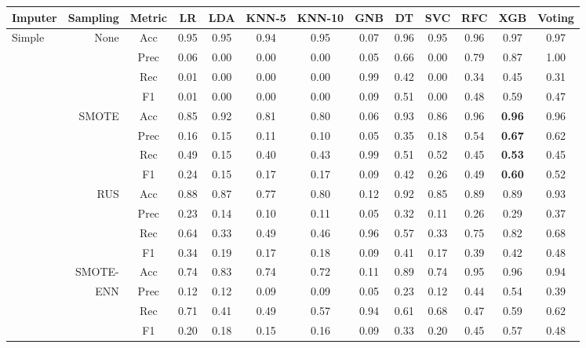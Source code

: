 \begin{table*}
\ContinuedFloat
\begin{narrow}{-1cm}{-1cm}
\begin{subtable}[t]{2.05\columnwidth}
    \centering
    \begin{tabular}{l|r|c|cccccccccc}
       Imputer & Sampling & Metric & LR & LDA & KNN-5 & KNN-10 & GNB & DT & SVC & RFC & XGB & Voting \\
        \hline \hline
        
        Simple & None & Acc & 0.95 & 0.95 & 0.94 & 0.95 & 0.07 & 0.96 & 0.95 & 0.96 & 0.97 & 0.97 \\
        ~ & ~ & Prec & 0.06 & 0.00 & 0.00 & 0.00 & 0.05 & 0.66 & 0.00 & 0.79 & 0.87 & 1.00 \\
        ~ & ~ & Rec & 0.01 & 0.00 & 0.00 & 0.00 & 0.99 & 0.42 & 0.00 & 0.34 & 0.45 & 0.31 \\
        ~ & ~ & F1 & 0.01 & 0.00 & 0.00 & 0.00 & 0.09 & 0.51 & 0.00 & 0.48 & 0.59 & 0.47 \\
        \cline{2-13}
        ~ & SMOTE & Acc & 0.85 & 0.92 & 0.81 & 0.80 & 0.06 & 0.93 & 0.86 & 0.96 & \textbf{0.96} & 0.96 \\
        ~ & ~ & Prec & 0.16 & 0.15 & 0.11 & 0.10 & 0.05 & 0.35 & 0.18 & 0.54 & \textbf{0.67} & 0.62 \\
        ~ & ~ & Rec & 0.49 & 0.15 & 0.40 & 0.43 & 0.99 & 0.51 & 0.52 & 0.45 & \textbf{0.53} & 0.45 \\
        ~ & ~ & F1 & 0.24 & 0.15 & 0.17 & 0.17 & 0.09 & 0.42 & 0.26 & 0.49 & \textbf{0.60} & 0.52 \\
        \cline{2-13}
        ~ & RUS & Acc & 0.88 & 0.87 & 0.77 & 0.80 & 0.12 & 0.92 & 0.85 & 0.89 & 0.89 & 0.93 \\
        ~ & ~ & Prec & 0.23 & 0.14 & 0.10 & 0.11 & 0.05 & 0.32 & 0.11 & 0.26 & 0.29 & 0.37 \\
        ~ & ~ & Rec & 0.64 & 0.33 & 0.49 & 0.46 & 0.96 & 0.57 & 0.33 & 0.75 & 0.82 & 0.68 \\
        ~ & ~ & F1 & 0.34 & 0.19 & 0.17 & 0.18 & 0.09 & 0.41 & 0.17 & 0.39 & 0.42 & 0.48 \\
        \cline{2-13}
        ~ & SMOTE- & Acc & 0.74 & 0.83 & 0.74 & 0.72 & 0.11 & 0.89 & 0.74 & 0.95 & 0.96 & 0.94 \\
        ~ & ENN & Prec & 0.12 & 0.12 & 0.09 & 0.09 & 0.05 & 0.23 & 0.12 & 0.44 & 0.54 & 0.39 \\
        ~ & ~ & Rec & 0.71 & 0.41 & 0.49 & 0.57 & 0.94 & 0.61 & 0.68 & 0.47 & 0.59 & 0.62 \\
        ~ & ~ & F1 & 0.20 & 0.18 & 0.15 & 0.16 & 0.09 & 0.33 & 0.20 & 0.45 & 0.57 & 0.48 \\
        \hline\hline
        

\end{tabular}
\end{subtable}
\end{narrow}
\end{table*}
